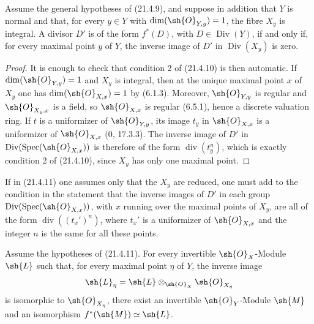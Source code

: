 \begin{corollary}[21.4.11]
\ifdefined\EGAIVSuppressErratumLabels\else\label{IV.21.4.11}\fi
Assume the general hypotheses of (21.4.9), and suppose in addition that
$Y$ is normal and that, for every $y\in Y$ with
$\dim(\sh{O}_{Y,y})=1$, the fibre $X_y$ is integral.  A divisor $D'$ is
of the form $f^*(D)$, with $D\in\operatorname{Div}(Y)$, if and only if,
for every maximal point $y$ of $Y$, the inverse image of $D'$ in
$\operatorname{Div}(X_y)$ is zero.
\end{corollary}

\begin{proof}
It is enough to check that condition 2\textdegree{} of (21.4.10) is then
automatic.  If $\dim(\sh{O}_{Y,y})=1$ and $X_y$ is integral, then at
the unique maximal point $x$ of $X_y$ one has
$\dim(\sh{O}_{X,x})=1$ by (6.1.3).  Moreover,
$\sh{O}_{Y,y}$ is regular and $\sh{O}_{X_y,x}$ is a field, so
$\sh{O}_{X,x}$ is regular (6.5.1), hence a discrete valuation ring.
If $t$ is a uniformizer of $\sh{O}_{Y,y}$, its image $t_y$ in
$\sh{O}_{X,x}$ is a uniformizer of $\sh{O}_{X,x}$
($0$, 17.3.3).  The inverse image of $D'$ in
$\operatorname{Div}(\operatorname{Spec}(\sh{O}_{X,x}))$ is therefore
of the form $\operatorname{div}(t_y^n)$, which is exactly condition
2\textdegree{} of (21.4.10), since $X_y$ has only one maximal point.
\end{proof}

\begin{remark}[21.4.12]
If in (21.4.11) one assumes only that the $X_y$ are reduced, one must
add to the condition in the statement that the inverse images of $D'$
in each group
$\operatorname{Div}(\operatorname{Spec}(\sh{O}_{X,x}))$, with $x$
running over the maximal points of $X_y$, are all of the form
$\operatorname{div}((t_x')^n)$, where $t_x'$ is a uniformizer of
$\sh{O}_{X,x}$ and the integer $n$ is the same for all these points.
\end{remark}

\begin{corollary}[21.4.13]
\ifdefined\EGAIVSuppressErratumLabels\else\label{IV.21.4.13}\fi
Assume the hypotheses of (21.4.11).  For every invertible
$\sh{O}_X$-Module $\sh{L}$ such that, for every maximal point $\eta$ of
$Y$, the inverse image
\[
 \sh{L}_\eta
 =\sh{L}\otimes_{\sh{O}_X}\sh{O}_{X_\eta}
\]
is isomorphic to $\sh{O}_{X_\eta}$, there exist an invertible
$\sh{O}_Y$-Module $\sh{M}$ and an isomorphism
$f^*(\sh{M})\simeq\sh{L}$.
\end{corollary}

